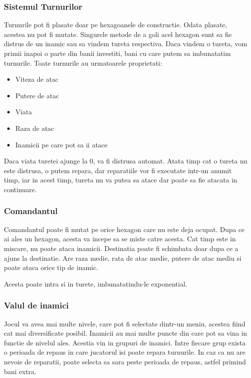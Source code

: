 \documentclass[12pt, a4paper]{article}
\begin{document}
	
	\subsubsection{Sistemul Turnurilor}
	
	Turnurile pot fi plasate doar pe hexagoanele de constructie. Odata plasate, acestea nu pot fi mutate. Singurele metode de a goli acel hexagon sunt sa fie distrus de un inamic sau sa vindem tureta respectiva. Daca vindem o tureta, vom primii inapoi o parte din banii investiti, bani cu care putem sa imbunatatim turnurile. Toate turnurile au urmatoarele proprietati:
	\begin{itemize}
		\item Viteza de atac
		\item Putere de atac
		\item Viata
		\item Raza de atac
		\item Inamicii pe care pot sa ii atace
	\end{itemize}

	Daca viata turetei ajunge la 0, va fi distrusa automat. Atata timp cat o tureta nu este distrusa, o putem repara, dar reparatiile vor fi executate intr-un anumit timp, iar in acest timp, tureta nu va putea sa atace dar poate sa fie atacata in continuare.
	
	\subsubsection{Comandantul}
	
	Comandantul poate fi mutat pe orice hexagon care nu este deja ocupat. Dupa ce ai ales un hexagon, acesta va incepe sa se miste catre acesta. Cat timp este in miscare, nu poate ataca inamicii. Destinatia poate fi schimbata doar dupa ce a ajuns la destinatie. Are raza medie, rata de atac medie, putere de atac mediu si poate ataca orice tip de inamic.
	
	Acesta poate intra si in turete, imbunatatindu-le exponential.
	
	\subsubsection{Valul de inamici}
	
	Jocul va avea mai multe nivele, care pot fi selectate dintr-un meniu, acestea fiind cat mai diversificate posibil. Inamicii au mai multe puncte din care pot sa vina in functie de nivelul ales. Acestia vin in grupuri de inamici. Intre fiecare grup exista o perioada de repaus in care jucatorul isi poate repara turnurile. In caz ca nu are nevoie de reparatii, poate selecta sa sara peste perioada de repaus, astfel primind bani extra.
	
\end{document}

